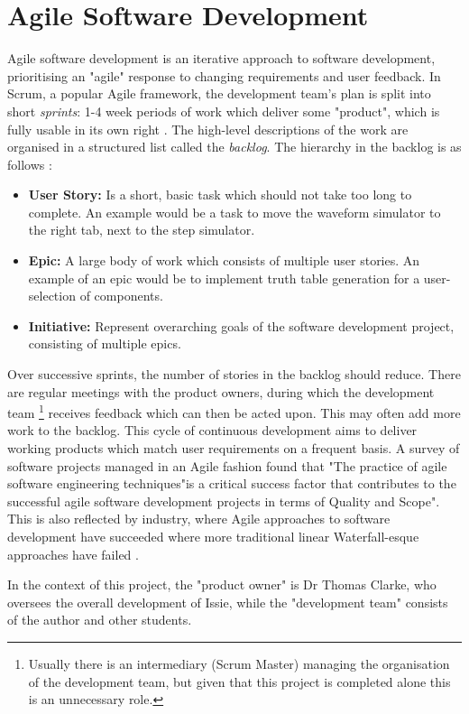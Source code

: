 \section{Agile Software Development}
Agile software development \cite{alma9955899676101591} is an iterative approach to software development, prioritising an "agile" response to changing requirements and user feedback. In Scrum, a popular Agile framework, the development team's plan is split into short \textit{sprints}: 1-4 week periods of work which deliver some "product", which is fully usable in its own right \cite{mepCW}. The high-level descriptions of the work are organised in a structured list called the \textit{backlog}. The hierarchy in the backlog is as follows \cite{backlog}:
\begin{itemize}
    \item \textbf{User Story:} Is a short, basic task which should not take too long to complete. An example would be a task to move the waveform simulator to the right tab, next to the step simulator.
    \item \textbf{Epic:} A large body of work which consists of multiple user stories. An example of an epic would be to implement truth table generation for a user-selection of components.
    \item \textbf{Initiative:} Represent overarching goals of the software development project, consisting of multiple epics.
\end{itemize}

Over successive sprints, the number of stories in the backlog should reduce. There are regular meetings with the product owners, during which the development team \footnote{Usually there is an intermediary (Scrum Master) managing the organisation of the development team, but given that this project is completed alone this is an unnecessary role.} receives feedback which can then be acted upon. This may often add more work to the backlog. This cycle of continuous development aims to deliver working products which match user requirements on a frequent basis.
A survey \cite{CHOW2008961} of software projects managed in an Agile fashion found that "The practice of agile software engineering techniques"is a critical success factor that contributes to the successful agile software development projects in terms of Quality and Scope". This is also reflected by industry, where Agile approaches to software development have succeeded where more traditional linear Waterfall-esque approaches have failed \cite{mepCW}.

In the context of this project, the "product owner" is Dr Thomas Clarke, who oversees the overall development of Issie, while the "development team" consists of the author and other students.